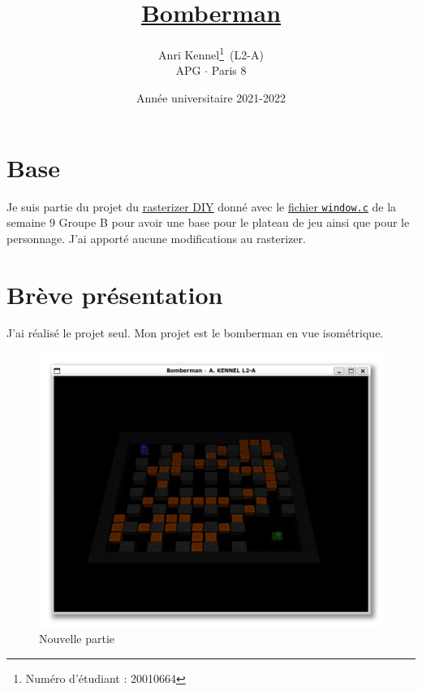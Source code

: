 \documentclass{article}
\title{\href{https://code.up8.edu/Anri/bomberman}{Bomberman}}
\author{Anri Kennel\thanks{Numéro d'étudiant : 20010664}\, (L2-A)\\APG $\cdot$ Paris 8}
\date{Année universitaire 2021-2022}
\begin{document}
    \maketitle
    \tableofcontents
    \clearpage

    \section{Base}
    Je suis partie du projet du \href{https://expreg.org/amsi/C/APG2122S1/code/sc_00_07_rasterizer-0.1.tgz}{\underline{rasterizer DIY}}
    donné avec le \href{https://expreg.org/amsi/C/APG2122S1/code/S9GB/MODIF1/window.c}{\underline{fichier \texttt{window.c}}} de la semaine 9 Groupe B
    pour avoir une base pour le plateau de jeu ainsi que pour le personnage.
    J'ai apporté aucune modifications au rasterizer.

    \section[Présentation]{Brève présentation}
    J'ai réalisé le projet seul. Mon projet est le bomberman en vue isométrique.

    \begin{figure}[!ht]
        \centering
        \includegraphics[height=0.49\textheight]{game.png}
        \caption{Nouvelle partie}
    \end{figure}
\end{document}
